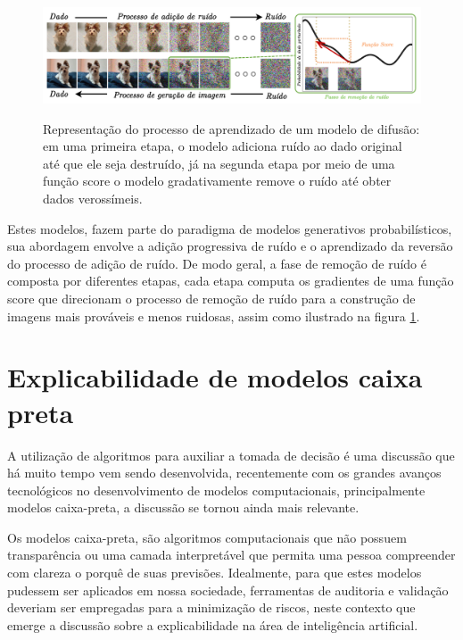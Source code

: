 \begin{figure}[htbp]
	\centering
	\caption[Representação do processo de aprendizado de um modelo de difusão]{Representação do processo de aprendizado de um modelo de difusão: em uma primeira etapa, o modelo adiciona ruído ao dado original até que ele seja destruído, já na segunda etapa por meio de uma função score o modelo gradativamente remove o ruído até obter dados verossímeis.}
		\includegraphics[scale=.28]{imagens/difussion-model.png}
	\label{fig:diffusion-model}
\end{figure}

Estes modelos, fazem parte do paradigma de modelos generativos probabilísticos, sua abordagem envolve a adição progressiva de ruído e o aprendizado da reversão do processo de adição de ruído. De modo geral, a fase de remoção de ruído é composta por diferentes etapas, cada etapa computa os gradientes de uma função score que direcionam o processo de remoção de ruído para a construção de imagens mais prováveis e menos ruidosas, assim como ilustrado na figura \ref{fig:diffusion-model}.



\section{Explicabilidade de modelos caixa preta}

A utilização de algoritmos para auxiliar a tomada de decisão é uma discussão que há muito tempo vem sendo desenvolvida, recentemente com os grandes avanços tecnológicos no desenvolvimento de modelos computacionais, principalmente modelos caixa-preta, a discussão se tornou ainda mais relevante.

Os modelos caixa-preta, são algoritmos computacionais que não possuem transparência ou uma camada interpretável que permita uma pessoa compreender com clareza o porquê de suas previsões. Idealmente, para que estes modelos pudessem ser aplicados em nossa sociedade, ferramentas de auditoria e validação deveriam ser empregadas para a minimização de riscos, neste contexto que emerge a discussão sobre a explicabilidade na área de inteligência artificial.

